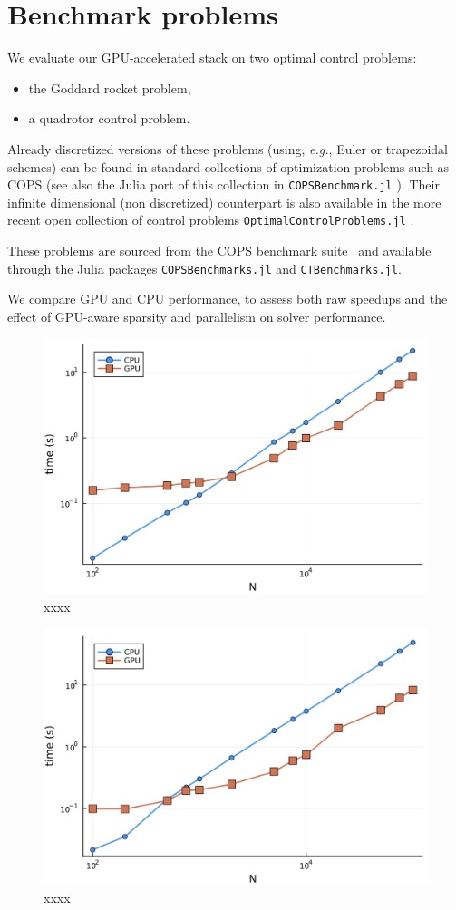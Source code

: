 \section{Benchmark problems}
We evaluate our GPU-accelerated stack on two optimal control problems:
\begin{itemize}
    \item the Goddard rocket problem,
    \item a quadrotor control problem.
\end{itemize}
Already discretized versions of these problems (using, \emph{e.g.}, Euler or trapezoidal schemes) can be found in standard collections of optimization problems such as COPS \cite{xxxx} (see also the Julia port of this collection in \texttt{COPSBenchmark.jl} \cite{xxxx}). Their infinite dimensional (non discretized) counterpart is also available in the more recent open collection of control problems \texttt{OptimalControlProblems.jl} \cite{xxxx}.



These problems are sourced from the COPS benchmark suite~\cite{bondarenko2000cops} and available through the Julia packages \texttt{COPSBenchmarks.jl} and \texttt{CTBenchmarks.jl}.

We compare GPU and CPU performance,
to assess both raw speedups and the effect of GPU-aware sparsity and parallelism on solver performance.

\begin{figure}
\includegraphics[width=.45\textwidth]{goddard-a100.jpg}
\caption{xxxx}
\label{fig1}
\end{figure}

 \begin{figure}
\includegraphics[width=.45\textwidth]{quadrotor-a100.jpg}
\caption{xxxx}
\label{fig2}
\end{figure}

